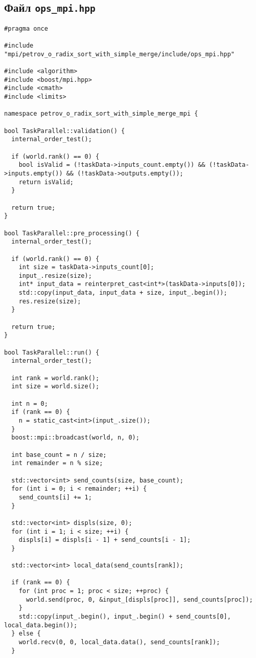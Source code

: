 \documentclass[12pt]{article}
\begin{document}
\subsection*{Файл \texttt{ops\_mpi.hpp}}

\begin{lstlisting}[caption={Параллельная версия поразрядной сортировки с использованием MPI}]
#pragma once

#include "mpi/petrov_o_radix_sort_with_simple_merge/include/ops_mpi.hpp"

#include <algorithm>
#include <boost/mpi.hpp>
#include <cmath>
#include <limits>

namespace petrov_o_radix_sort_with_simple_merge_mpi {

bool TaskParallel::validation() {
  internal_order_test();

  if (world.rank() == 0) {
    bool isValid = (!taskData->inputs_count.empty()) && (!taskData->inputs.empty()) && (!taskData->outputs.empty());
    return isValid;
  }

  return true;
}

bool TaskParallel::pre_processing() {
  internal_order_test();

  if (world.rank() == 0) {
    int size = taskData->inputs_count[0];
    input_.resize(size);
    int* input_data = reinterpret_cast<int*>(taskData->inputs[0]);
    std::copy(input_data, input_data + size, input_.begin());
    res.resize(size);
  }

  return true;
}

bool TaskParallel::run() {
  internal_order_test();

  int rank = world.rank();
  int size = world.size();

  int n = 0;
  if (rank == 0) {
    n = static_cast<int>(input_.size());
  }
  boost::mpi::broadcast(world, n, 0);

  int base_count = n / size;
  int remainder = n % size;

  std::vector<int> send_counts(size, base_count);
  for (int i = 0; i < remainder; ++i) {
    send_counts[i] += 1;
  }

  std::vector<int> displs(size, 0);
  for (int i = 1; i < size; ++i) {
    displs[i] = displs[i - 1] + send_counts[i - 1];
  }

  std::vector<int> local_data(send_counts[rank]);

  if (rank == 0) {
    for (int proc = 1; proc < size; ++proc) {
      world.send(proc, 0, &input_[displs[proc]], send_counts[proc]);
    }
    std::copy(input_.begin(), input_.begin() + send_counts[0], local_data.begin());
  } else {
    world.recv(0, 0, local_data.data(), send_counts[rank]);
  }


\end{lstlisting}
\end{document}
